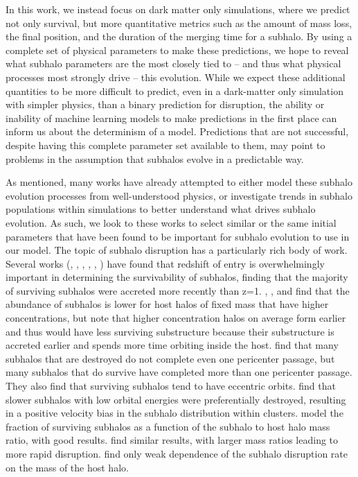 \documentclass[fleqn,usenatbib]{mnras}
\begin{document}
In this work, we instead focus on dark matter only simulations, where we predict not only survival, but more quantitative metrics such as the amount of mass loss, the final position, and the duration of the merging time for a subhalo. By using a complete set of physical parameters to make these predictions, we hope to reveal what subhalo parameters are the most closely tied to -- and thus what physical processes most strongly drive -- this evolution. While we expect these additional quantities to be more difficult to predict, even in a dark-matter only simulation with simpler physics, than a binary prediction for disruption, the ability or inability of machine learning models to make predictions in the first place can inform us about the determinism of a model. Predictions that are not successful, despite having this complete parameter set available to them, may point to problems in the assumption that subhalos evolve in a predictable way.

As mentioned, many works have already attempted to either model these subhalo evolution processes from well-understood physics, or investigate trends in subhalo populations within simulations to better understand what drives subhalo evolution. As such, we look to these works to select similar or the same initial parameters that have been found to be important for subhalo evolution to use in our model. The topic of subhalo disruption has a particularly rich body of work. Several works (\citet{Ghigna2000}, \citet{Diemand2004}, \citet{Gao2004}, \citet{Zentner2004}, \citet{Penarrubia2005}, \citet{Diemand2007}) have found that redshift of entry is overwhelmingly important in determining the survivability of subhalos, finding that the majority of surviving subhalos were accreted more recently than z=1. \citet{Gao2004}, \citet{Giocoli2009}, and \citet{Gao2011} find that the abundance of subhalos is lower for host halos of fixed mass that have higher concentrations, but note that higher concentration halos on average form earlier and thus would have less surviving substructure because their substructure is accreted earlier and spends more time orbiting inside the host. \citet{Klimentowski2010} find that many subhalos that are destroyed do not complete even one pericenter passage, but many subhalos that do survive have completed more than one pericenter passage. They also find that surviving subhalos tend to have eccentric orbits. \citet{Diemand2004} find that slower subhalos with low orbital energies were preferentially destroyed, resulting in a positive velocity bias in the subhalo distribution within clusters. \citet{Yang2009} model the fraction of surviving subhalos as a function of the subhalo to host halo mass ratio, with good results. \citet{Tormen1998} find similar results, with larger mass ratios leading to more rapid disruption. \citet{Gill2004} find only weak dependence of the subhalo disruption rate on the mass of the host halo.
\end{document}
